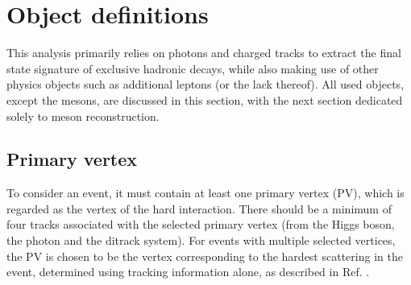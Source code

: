 \section{Object definitions}\label{sec:objects}

This analysis primarily relies on photons and charged tracks to extract the final state signature of exclusive hadronic decays, while also making use of other physics objects such as additional leptons (or the lack thereof). All used objects, except the mesons, are discussed in this section, with the next section dedicated solely to meson reconstruction.

\subsection{Primary vertex}
To consider an event, it must contain at least one primary vertex (PV), which is regarded as the vertex of the hard interaction. There should be a minimum of four tracks associated with the selected primary vertex (from the Higgs boson, the photon and the ditrack system). For events with multiple selected vertices, the PV is chosen to be the vertex corresponding to the hardest scattering in the event, determined using tracking information alone, as described in Ref. \cite{Contardo:2015bmq}.




